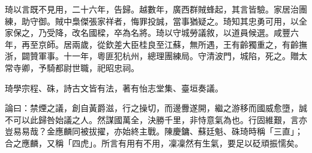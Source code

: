 \begin{pinyinscope}
琦以言既不見用，二十六年，告歸。越數年，廣西群賊蜂起，其言皆驗。家居治團練，助守御。賊中梟傑張家祥者，悔罪投誠，當事猶疑之。琦知其忠勇可用，以全家保之，乃受降，改名國樑，卒為名將。琦以守城勞議敘，以道員候選。咸豐六年，再至京師。居兩歲，從欽差大臣桂良至江蘇，無所遇，王有齡獨重之，有齡撫浙，闢贊軍事。十一年，粵匪犯杭州，總理團練局。守清波門，城陷，死之。贈太常寺卿，予騎都尉世職，祀昭忠祠。

琦學宗程、硃，詩古文皆有法，著有怡志堂集、臺垣奏議。

論曰：禁煙之議，創自黃爵滋，行之操切，而邊釁遂開，繼之游移而國威愈墮，誠不可以此歸咎始議之人。然謀國萬全，決勝千里，非恃意氣為也。行固維艱，言亦豈易易哉？金應麟同被拔擢，亦始終主戰。陳慶鏞、蘇廷魁、硃琦時稱「三直」；合之應麟，又稱「四虎」。所言有用有不用，凜凜然有生氣，要足以砭頑振懦矣。


\end{pinyinscope}